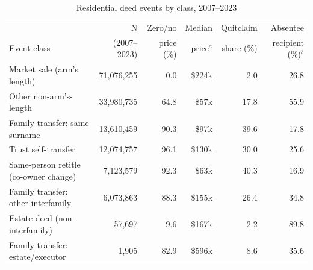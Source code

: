 \begin{table}[!t]\centering
\caption{Residential deed events by class, 2007--2023}
\label{tab:taxonomy}
{\small
\begin{tabular}{lrrrrr}
\toprule
 & N & Zero/no & Median & Quitclaim & Absentee \\
Event class & (2007--2023) & price (\%) & price$^{a}$ & share (\%) & recipient (\%)$^{b}$ \\
\midrule
Market sale (arm's length) & 71,076,255 & 0.0 & \$224k & 2.0 & 26.8 \\
Other non-arm's-length & 33,980,735 & 64.8 & \$57k & 17.8 & 55.9 \\
Family transfer: same surname & 13,610,459 & 90.3 & \$97k & 39.6 & 17.8 \\
Trust self-transfer & 12,074,757 & 96.1 & \$130k & 30.0 & 25.6 \\
Same-person retitle (co-owner change) & 7,123,579 & 92.3 & \$63k & 40.3 & 16.9 \\
Family transfer: other interfamily & 6,073,863 & 88.3 & \$155k & 26.4 & 34.8 \\
Estate deed (non-interfamily) & 57,697 & 9.6 & \$167k & 2.2 & 89.8 \\
Family transfer: estate/executor & 1,905 & 82.9 & \$596k & 8.6 & 35.6 \\
\bottomrule
\end{tabular}}
\begin{minipage}{0.95\textwidth}\end{minipage}
\end{table}
